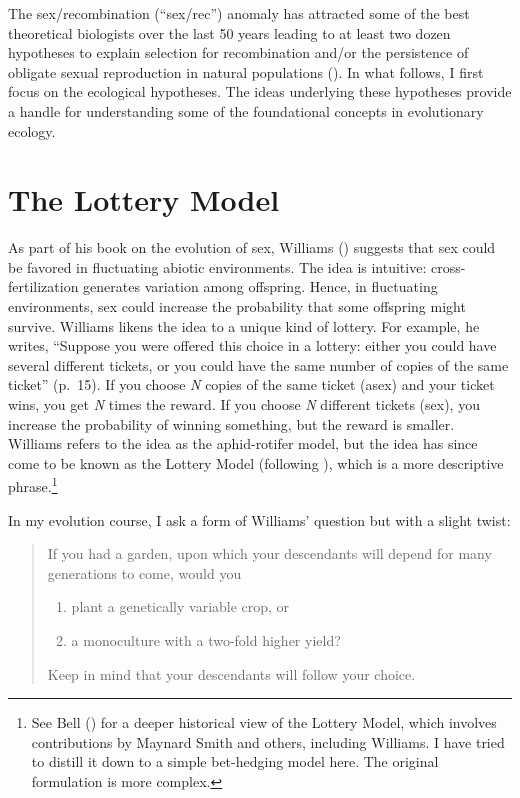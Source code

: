 \documentclass[
  american,
  letterpaper,
]{book}
\providecommand{\tightlist}{%
  \setlength{\itemsep}{0pt}\setlength{\parskip}{0pt}}\usepackage{longtable,booktabs,array}
\begin{document}
The sex/recombination (``sex/rec'') anomaly has attracted some of the
best theoretical biologists over the last 50 years leading to at least
two dozen hypotheses to explain selection for recombination and/or the
persistence of obligate sexual reproduction in natural populations
(). In what follows, I
first focus on the ecological hypotheses. The ideas underlying these
hypotheses provide a handle for understanding some of the foundational
concepts in evolutionary ecology.

\section{The Lottery Model}\label{the-lottery-model}

As part of his book on the evolution of sex, Williams
() suggests that sex could be favored
in fluctuating abiotic environments. The idea is intuitive:
cross-fertilization generates variation among offspring. Hence, in
fluctuating environments, sex could increase the probability that some
offspring might survive. Williams likens the idea to a unique kind of
lottery. For example, he writes, ``Suppose you were offered this choice
in a lottery: either you could have several different tickets, or you
could have the same number of copies of the same ticket'' (p.~15). If
you choose \emph{N} copies of the same ticket (asex) and your ticket
wins, you get \emph{N} times the reward. If you choose \emph{N}
different tickets (sex), you increase the probability of winning
something, but the reward is smaller. Williams refers to the idea as the
aphid-rotifer model, but the idea has since come to be known as the
Lottery Model (following ), which is
a more descriptive phrase.\footnote{See Bell
  () for a deeper historical view of the
  Lottery Model, which involves contributions by Maynard Smith and
  others, including Williams. I have tried to distill it down to a
  simple bet-hedging model here. The original formulation is more
  complex.}

In my evolution course, I ask a form of Williams' question but with a
slight twist:

\begin{quote}
If you had a garden, upon which your descendants will depend for many
generations to come, would you

\begin{enumerate}
\def\labelenumi{\arabic{enumi}.}
\tightlist
\item
  plant a genetically variable crop, or
\item
  a monoculture with a two-fold higher yield?
\end{enumerate}

Keep in mind that your descendants will follow your choice.
\end{quote}
\end{document}
